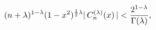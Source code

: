 \[{(n+\lambda)^{1-\lambda}(1-x^{2})^{\frac{1}{2}\lambda}|\mathop{C^{(\lambda)}_{%
n}\/}\nolimits\!\left(x\right)|<\frac{2^{1-\lambda}}{\mathop{\Gamma\/}%
\nolimits\!\left(\lambda\right)}},\]